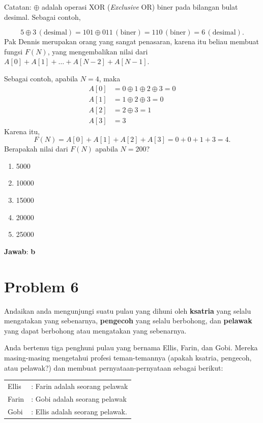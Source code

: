\documentclass{article}
\theoremstyle{plain}
\begin{document}
\bigskip
\noindent Catatan: $\oplus$ adalah operasi XOR (\textit{Exclusive} OR) biner pada bilangan bulat desimal. Sebagai contoh,

\begin{equation*}
5 \oplus 3 \, (\text{desimal}) = 101 \oplus 011 \, (\text{biner}) = 110 \, (\text{biner}) = 6 \, (\text{desimal}). 
\end{equation*}
Pak Dennis merupakan orang yang sangat penasaran, karena itu beliau membuat fungsi $F(N)$, yang mengembalikan nilai dari $A[0] + A[1] + \ldots + A[N - 2] + A[N - 1]$. 

\bigskip
\noindent Sebagai contoh, apabila $N=4$, maka
\begin{align*}
A[0] &= 0 \oplus 1 \oplus 2 \oplus 3 = 0 \\
A[1] &= 1 \oplus 2 \oplus 3 = 0 \\
A[2] &= 2 \oplus 3 = 1 \\
A[3] &= 3 
\end{align*}
Karena itu,
\begin{equation*}
	F(N) = A[0] + A[1] + A[2] + A[3] = 0 + 0 + 1 + 3 = 4.
\end{equation*}
Berapakah nilai dari $F(N)$ apabila $N=200$?

	\begin{enumerate}[-,topsep=0pt, nosep,label=\alph*. ]
		\item 5000
		\item 10000
		\item 15000
		\item 20000
		\item 25000
	\end{enumerate}

\bigskip
\noindent \textbf{Jawab}: \textbf{b}

\newpage
\section*{Problem 6}
Andaikan anda mengunjungi suatu pulau yang dihuni oleh \textbf{ksatria} yang selalu mengatakan yang sebenarnya, \textbf{pengecoh} yang selalu berbohong, dan \textbf{pelawak} yang dapat berbohong atau mengatakan yang sebenarnya. 

\bigskip
\noindent Anda bertemu tiga penghuni pulau yang bernama Ellis, Farin, dan Gobi. Mereka masing-masing mengetahui profesi teman-temannya (apakah ksatria, pengecoh, atau pelawak?) dan membuat pernyataan-pernyataan sebagai berikut:

\bigskip
\noindent \begin{tabular}{ll}
	Ellis &: Farin adalah seorang pelawak \\
	Farin &: Gobi adalah seorang pelawak \\
	Gobi  &: Ellis adalah seorang pelawak.
\end{tabular} 
\end{document}
